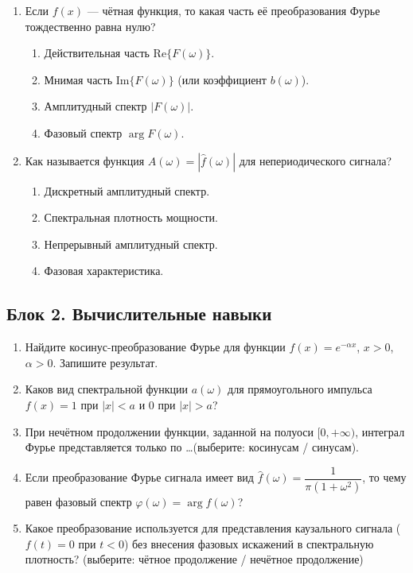 \documentclass[12pt,a4paper]{article}
\begin{document}
\begin{enumerate}[label=\textbf{1.\arabic*.}]
    \item Если $f(x)$ --- чётная функция, то какая часть её преобразования Фурье тождественно равна нулю?
    \begin{enumerate}[label=\alph*)]
        \item Действительная часть $\text{Re}\{F(\omega)\}$.
        \item Мнимая часть $\text{Im}\{F(\omega)\}$ (или коэффициент $b(\omega)$).
        \item Амплитудный спектр $|F(\omega)|$.
        \item Фазовый спектр $\arg F(\omega)$.
    \end{enumerate}

    \item Как называется функция $A(\omega) = |\hat{f}(\omega)|$ для непериодического сигнала?
    \begin{enumerate}[label=\alph*)]
        \item Дискретный амплитудный спектр.
        \item Спектральная плотность мощности.
        \item Непрерывный амплитудный спектр.
        \item Фазовая характеристика.
    \end{enumerate}
\end{enumerate}

\subsection*{Блок 2. Вычислительные навыки}
\begin{enumerate}[label=\textbf{2.\arabic*.}]
    \item Найдите косинус-преобразование Фурье для функции $f(x) = e^{-\alpha x}$, $x > 0$, $\alpha > 0$. Запишите результат.
    
    \item Каков вид спектральной функции $a(\omega)$ для прямоугольного импульса $f(x) = 1$ при $|x| < a$ и $0$ при $|x| > a$?
    
    \item При нечётном продолжении функции, заданной на полуоси $[0, +\infty)$, интеграл Фурье представляется только по \dots (выберите: косинусам / синусам).
    
    \item Если преобразование Фурье сигнала имеет вид $\hat{f}(\omega) = \dfrac{1}{\pi(1+\omega^2)}$, то чему равен фазовый спектр $\varphi(\omega) = \arg \hat{f}(\omega)$?
    
    \item Какое преобразование используется для представления каузального сигнала ($f(t)=0$ при $t<0$) без внесения фазовых искажений в спектральную плотность? (выберите: чётное продолжение / нечётное продолжение)
\end{enumerate}
\end{document}
